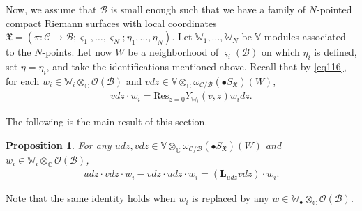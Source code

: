 \documentclass[12pt,a4paper,notitlepage]{report}
\theoremstyle{definition}
\theoremstyle{plain}
\newtheorem{pp}[df]{Proposition}
\newcommand{\fk}{\mathfrak}
\newcommand{\mc}{\mathcal}
\newcommand{\Res}{\mathrm{Res}}
\newcommand{\scr}{\mathscr}
\newcommand{\sgm}{\varsigma}
\newcommand{\mbf}{\mathbf}
\newcommand{\blt}{\bullet}
\newcommand{\Vbb}{\mathbb V}
\newcommand{\Wbb}{\mathbb W}
\newcommand{\Cbb}{\mathbb C}
\numberwithin{equation}{section}
\begin{document}
Now, we assume that $\mc B$ is small enough such that we have a family of $N$-pointed compact Riemann surfaces with local coordinates $\fk X=(\pi:\mc C\rightarrow\mc B;\sgm_1,\dots,\sgm_N;\eta_1,\dots,\eta_N)$. Let $\Wbb_1,\dots,\Wbb_N$ be $\Vbb$-modules associated to the $N$-points. Let now $W$ be a neighborhood of $\sgm_i(\mc B)$ on which $\eta_i$ is defined,  set $\eta=\eta_i$, and take the identifications mentioned above. Recall that by \eqref{eq116}, for each $w_i\in\Wbb_i\otimes_\Cbb\scr O(\mc B)$ and $vdz\in\Vbb\otimes_\Cbb\omega_{\mc C/\mc B}(\blt S_{\fk X})(W)$,
\begin{align*}
vdz\cdot w_i=\Res_{z=0}Y_{\Wbb_i}(v,z)w_idz.
\end{align*}


The following is the main result of this section.

\begin{pp}\label{lb51}
For any $udz,vdz\in\Vbb\otimes_\Cbb\omega_{\mc C/\mc B}(\blt S_{\fk X})(W)$ and $w_i\in\Wbb_i\otimes_\Cbb\scr O(\mc B)$,
\begin{align*}
udz\cdot vdz\cdot w_i-vdz\cdot udz\cdot w_i=(\mbf L_{udz}vdz)\cdot w_i.
\end{align*}
\end{pp}
Note that the same identity holds when $w_i$ is replaced by any $w\in\Wbb_\blt\otimes_\Cbb\scr O(\mc B)$.
\end{document}
